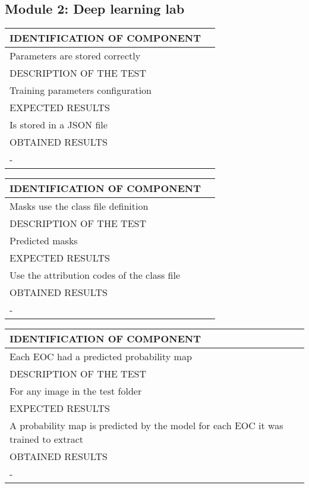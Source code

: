 \documentclass{polytech/polytech}
\numberwithin{figure}{chapter}
\begin{document}
\begin{appendix}
\subsection{Module 2: Deep learning lab}

\begin{table}[]
\begin{tabular}{|l|l|}\hline
\color{C} IDENTIFICATION OF COMPONENT \\\hline
Parameters are stored correctly  \\\hline
\color{C} DESCRIPTION OF THE TEST\\\hline
Training parameters configuration  \\\hline
\color{C} EXPECTED RESULTS \\\hline
Is stored in a JSON file \\\hline
\color{C} OBTAINED RESULTS \\\hline
- \\\hline
\end{tabular}
\end{table}

\begin{table}[]
\begin{tabular}{|l|l|}\hline
\color{C} IDENTIFICATION OF COMPONENT \\\hline
Masks use the class file definition  \\\hline
\color{C} DESCRIPTION OF THE TEST\\\hline
Predicted masks   \\\hline
\color{C} EXPECTED RESULTS \\\hline
Use the attribution codes of the class file \\\hline
\color{C} OBTAINED RESULTS \\\hline
- \\\hline
\end{tabular}
\end{table}

\begin{table}[]
\begin{tabular}{|l|l|}\hline
\color{C} IDENTIFICATION OF COMPONENT \\\hline
Each EOC had a predicted probability map  \\\hline
\color{C} DESCRIPTION OF THE TEST\\\hline
For any image in the test folder   \\\hline
\color{C} EXPECTED RESULTS \\\hline
A probability map is predicted by the model for each EOC it was trained to extract \\\hline
\color{C} OBTAINED RESULTS \\\hline
- \\\hline
\end{tabular}
\end{table}


\end{appendix}
\end{document}
